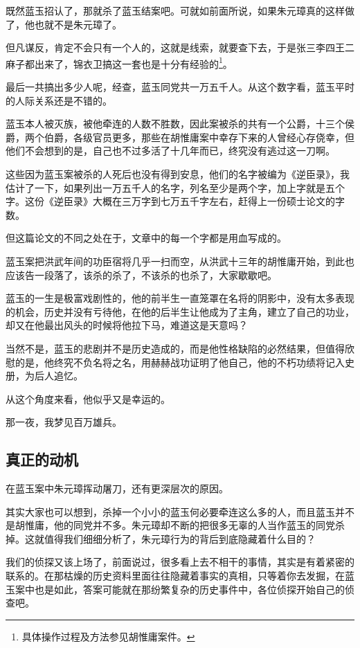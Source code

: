 \begin{multicols}{\theparacolNo}
		既然蓝玉招认了，那就杀了蓝玉结案吧。可就如前面所说，如果朱元璋真的这样做了，他也就不是朱元璋了。

		但凡谋反，肯定不会只有一个人的，这就是线索，就要查下去，于是张三李四王二麻子都出来了，锦衣卫搞这一套也是十分有经验的\footnote{具体操作过程及方法参见胡惟庸案件。}。

		最后一共搞出多少人呢，经查，蓝玉同党共一万五千人。从这个数字看，蓝玉平时的人际关系还是不错的。

		蓝玉本人被灭族，被他牵连的人数不胜数，因此案被杀的共有一个公爵，十三个侯爵，两个伯爵，各级官员更多，那些在胡惟庸案中幸存下来的人曾经心存侥幸，但他们不会想到的是，自己也不过多活了十几年而已，终究没有逃过这一刀啊。

		这些因为蓝玉案被杀的人死后也没有得到安息，他们的名字被编为《逆臣录》，我估计了一下，如果列出一万五千人的名字，列名至少是两个字，加上字就是五个字。这份《逆臣录》大概在三万字到七万五千字左右，赶得上一份硕士论文的字数。

		但这篇论文的不同之处在于，文章中的每一个字都是用血写成的。

		蓝玉案把洪武年间的功臣宿将几乎一扫而空，从洪武十三年的胡惟庸开始，到此也应该告一段落了，该杀的杀了，不该杀的也杀了，大家歇歇吧。

		蓝玉的一生是极富戏剧性的，他的前半生一直笼罩在名将的阴影中，没有太多表现的机会，历史并没有亏待他，在他的后半生让他成为了主角，建立了自己的功业，却又在他最出风头的时候将他拉下马，难道这是天意吗？

		当然不是，蓝玉的悲剧并不是历史造成的，而是他性格缺陷的必然结果，但值得欣慰的是，他终究不负名将之名，用赫赫战功证明了他自己，他的不朽功绩将记入史册，为后人追忆。

		从这个角度来看，他似乎又是幸运的。

		那一夜，我梦见百万雄兵。

		\subsection{真正的动机}
		在蓝玉案中朱元璋挥动屠刀，还有更深层次的原因。

		其实大家也可以想到，杀掉一个小小的蓝玉何必要牵连这么多的人，而且蓝玉并不是胡惟庸，他的同党并不多。朱元璋却不断的把很多无辜的人当作蓝玉的同党杀掉。这就值得我们细细分析了，朱元璋行为的背后到底隐藏着什么目的？

		我们的侦探又该上场了，前面说过，很多看上去不相干的事情，其实是有着紧密的联系的。在那枯燥的历史资料里面往往隐藏着事实的真相，只等着你去发掘，在蓝玉案中也是如此，答案可能就在那纷繁复杂的历史事件中，各位侦探开始自己的侦查吧。


\end{multicols}
